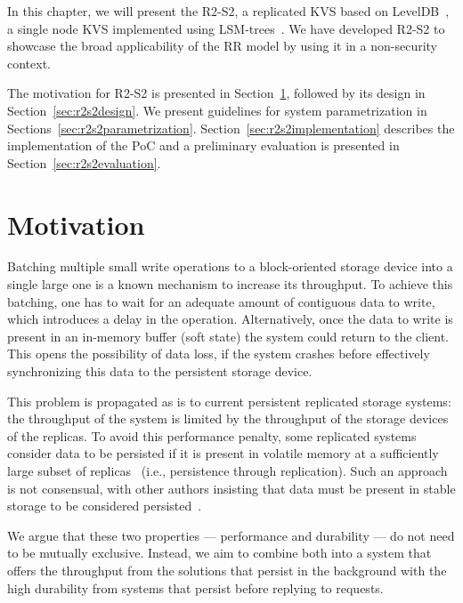 \label{chap:storage}
\cleardoublepage{}

In this chapter, we will present the \acf{R2-S2}, a replicated
\ac{KVS} based on LevelDB~\cite{leveldb}, a single node \ac{KVS}
implemented using  \acp{LSM-tree}~\cite{lsm}. We have developed
\ac{R2-S2} to showcase the broad applicability of the \ac{RR}
model by using it in a non-security context.

The motivation for \ac{R2-S2} is presented in
Section~\ref{sec:r2s2motivation}, followed by its design in
Section~\ref{sec:r2s2design}. We present guidelines for system
parametrization in Sections~\ref{sec:r2s2parametrization}.
Section~\ref{sec:r2s2implementation} describes the implementation
of the PoC and a preliminary evaluation is presented in
Section~\ref{sec:r2s2evaluation}.

\section{Motivation}\label{sec:r2s2motivation}
Batching multiple small write operations to a block-oriented storage device into a
single large one is a known mechanism to increase its throughput.
To achieve this batching, one has to wait for an adequate amount
of contiguous data to write, which introduces a delay in the
operation. Alternatively, once the data to write is present in
an in-memory buffer (soft state) the system could return to the
client. This opens the possibility of data loss, if the system
crashes before effectively synchronizing this data to the persistent
storage device.

%
This problem is propagated as is to current persistent replicated storage
systems: the throughput of the system is limited by the
throughput of the storage devices of the replicas. To avoid this
performance penalty, some replicated systems consider data to be persisted if it is
present in volatile memory at a sufficiently large subset of replicas~\cite{pbft}
(i.e., persistence through replication). Such an approach is not
consensual, with other authors insisting that data must be
present in stable storage to be considered
persisted~\cite{bolosky:paxos}.

We argue that these two properties --- performance and
durability --- do not need to be mutually exclusive. Instead, we
aim to combine both into a system that offers the throughput from
the solutions that persist in the background with the high
durability from systems that persist before replying to
requests.

